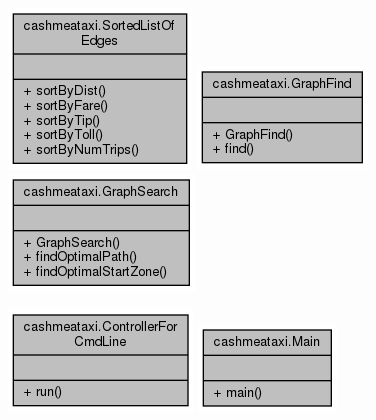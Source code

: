 \documentclass[12pt]{article}
\begin{document}
\begin{center}
\includegraphics[scale = 0.6]{uml/classcashmeataxi_1_1SortedListOfEdges__coll__graph.png}
\includegraphics[scale = 0.6]{uml/classcashmeataxi_1_1GraphFind__coll__graph.png} 
\includegraphics[scale = 0.6]{uml/classcashmeataxi_1_1GraphSearch__coll__graph.png} 

\includegraphics[scale = 0.6]{uml/classcashmeataxi_1_1ControllerForCmdLine__coll__graph.png} 
\includegraphics[scale = 0.6]{uml/classcashmeataxi_1_1Main__coll__graph.png} 


\end{center}
\end{document}
